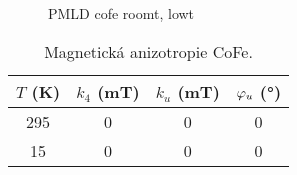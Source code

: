 \begin{figure}[htbp]
    \centering
    \caption{PMLD cofe roomt, lowt}
    \label{fig:vysledky-cofe-PMLD}
\end{figure}

\begin{table}[tp]
    \caption{Magnetická anizotropie CoFe.}
    \label{tab:cofe-anizotropie}
    \centering
    \begin{tabular}{cccc}
        \toprule
        $T$ (\si{\kelvin}) & $k_4$ (\si{\milli\tesla}) & $k_u$ (\si{\milli\tesla}) & $\varphi_u$ (\si{\degree}) \\ \midrule[\heavyrulewidth]
        295 & 0 & 0 & 0 \\
        15 & 0 & 0 & 0 \\
        \bottomrule 
    \end{tabular} 
\end{table}
